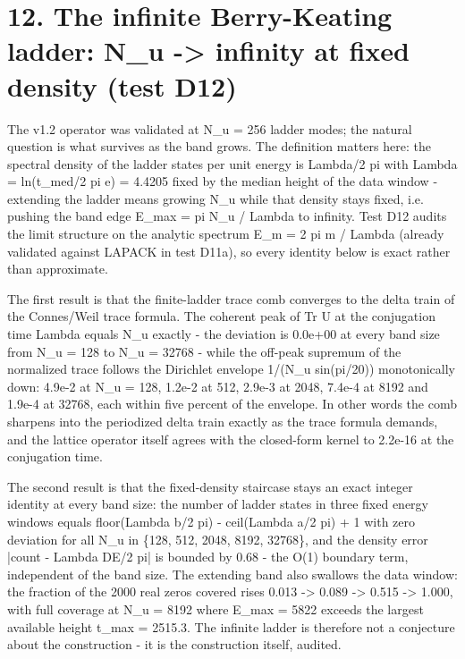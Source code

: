 \documentclass[11pt,a4paper]{article}
\begin{document}
\section{12. The infinite Berry-Keating ladder: N\_\allowbreak{}u -> infinity at fixed density (test D12)}
The v1.2 operator was validated at N\_\allowbreak{}u = 256 ladder modes; the natural question is what survives as the band grows. The definition matters here: the spectral density of the ladder states per unit energy is Lambda/2 pi with Lambda = ln(t\_\allowbreak{}med/2 pi e) = 4.4205 fixed by the median height of the data window - extending the ladder means growing N\_\allowbreak{}u while that density stays fixed, i.e. pushing the band edge E\_\allowbreak{}max = pi N\_\allowbreak{}u / Lambda to infinity. Test D12 audits the limit structure on the analytic spectrum E\_\allowbreak{}m = 2 pi m / Lambda (already validated against LAPACK in test D11a), so every identity below is exact rather than approximate.

The first result is that the finite-ladder trace comb converges to the delta train of the Connes/Weil trace formula. The coherent peak of Tr U at the conjugation time Lambda equals N\_\allowbreak{}u exactly - the deviation is 0.0e+00 at every band size from N\_\allowbreak{}u = 128 to N\_\allowbreak{}u = 32768 - while the off-peak supremum of the normalized trace follows the Dirichlet envelope 1/(N\_\allowbreak{}u sin(pi/20)) monotonically down: 4.9e-2 at N\_\allowbreak{}u = 128, 1.2e-2 at 512, 2.9e-3 at 2048, 7.4e-4 at 8192 and 1.9e-4 at 32768, each within five percent of the envelope. In other words the comb sharpens into the periodized delta train exactly as the trace formula demands, and the lattice operator itself agrees with the closed-form kernel to 2.2e-16 at the conjugation time.

The second result is that the fixed-density staircase stays an exact integer identity at every band size: the number of ladder states in three fixed energy windows equals floor(Lambda b/2 pi) - ceil(Lambda a/2 pi) + 1 with zero deviation for all N\_\allowbreak{}u in \{128, 512, 2048, 8192, 32768\}, and the density error |count - Lambda DE/2 pi| is bounded by 0.68 - the O(1) boundary term, independent of the band size. The extending band also swallows the data window: the fraction of the 2000 real zeros covered rises 0.013 -> 0.089 -> 0.515 -> 1.000, with full coverage at N\_\allowbreak{}u = 8192 where E\_\allowbreak{}max = 5822 exceeds the largest available height t\_\allowbreak{}max = 2515.3. The infinite ladder is therefore not a conjecture about the construction - it is the construction itself, audited.
\end{document}
